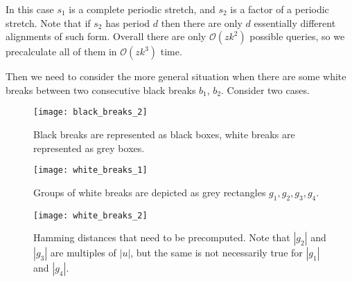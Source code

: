 \documentclass[runningheads]{llncs}
\begin{document}
\begin{mycases}[listparindent=15pt]
\item In this case $s_1$ is a complete periodic stretch, and $s_2$ is a factor of a periodic stretch. Note that if $s_2$ has period $d$ then there are only $d$ essentially different alignments of such form. Overall there are only $\mathcal{O}(zk^2)$ possible queries, so we precalculate all of them in $\mathcal{O}(zk^3)$ time.
\end{mycases}


Then we need to consider the more general situation when there are some white breaks between two consecutive black breaks $b_1$, $b_2$. Consider two cases.

\begin{figure}[t]
\texttt{[image: black\_breaks\_2]}
\caption{Black breaks are represented as black boxes, white breaks are represented as grey boxes.}
\label{figure:black_breaks_2}
\vspace{0.2cm}
\texttt{[image: white\_breaks\_1]}
\caption{Groups of white breaks are depicted as grey rectangles $g_{1},g_{2},g_{3},g_{4}$.}
\label{figure:white_breaks_1}
\vspace{0.2cm}
\texttt{[image: white\_breaks\_2]}
\caption{Hamming distances that need to be precomputed. Note that $|g_2|$ and $|g_3|$ are multiples of $|u|$, but the same is not necessarily true for $|g_1|$ and $|g_4|$.}
\label{figure:white_breaks_2}
\end{figure}
\end{document}
